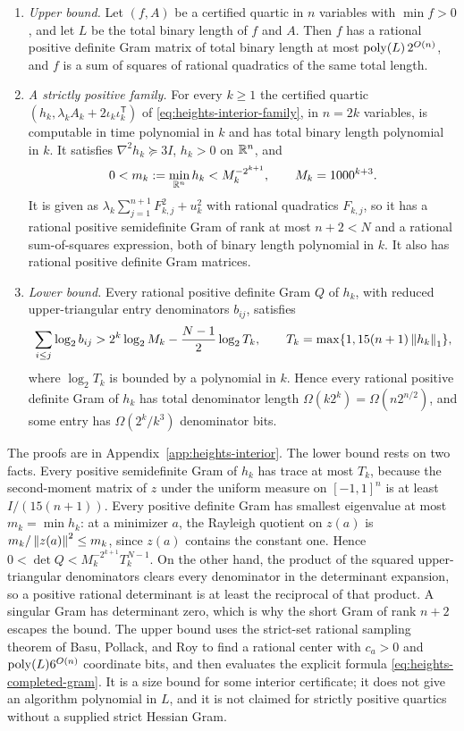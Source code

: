 \begin{theorem}
\label{thm:interior-gram}
\leavevmode
\begin{enumerate}[label=(\alph*)]
\item \emph{Upper bound.} Let $(f,A)$ be a certified quartic in $n$
  variables with $\min f>0$, and let $L$ be the total binary length of $f$
  and $A$. Then $f$ has a rational positive definite Gram matrix of total
  binary length at most $\operatorname{poly}(L)\,2^{O(n)}$, and $f$ is a sum of squares of
  rational quadratics of the same total length.
\item \emph{A strictly positive family.} For every $k\ge1$ the certified
  quartic $(h_k,\lambda_kA_k+2\iota_k\iota_k^{\mathsf T})$ of
  \eqref{eq:heights-interior-family}, in $n=2k$ variables, is computable in
  time polynomial in $k$ and has total binary length polynomial in $k$. It
  satisfies $\nabla^2h_k\succeq3I$, $h_k>0$ on $\mathbb R^n$, and
  \[
   0<m_k:=\min_{\mathbb R^n}h_k<M_k^{-2^{k+1}},\qquad M_k=1000^{k+3}.
  \]
  It is given as $\lambda_k\sum_{j=1}^{n+1}F_{k,j}^2+u_k^2$ with rational
  quadratics $F_{k,j}$, so it has a rational positive semidefinite Gram of
  rank at most $n+2<N$ and a rational sum-of-squares expression, both of
  binary length polynomial in $k$. It also has rational positive definite
  Gram matrices.
\item \emph{Lower bound.} Every rational positive definite Gram $Q$ of $h_k$,
  with reduced upper-triangular entry denominators $b_{ij}$, satisfies
  \[
   \sum_{i\le j}\log_2b_{ij}>2^k\log_2M_k-\frac{N-1}2\log_2T_k,
   \qquad T_k=\max\{1,15(n+1)\left\lVert h_k\right\rVert_1\},
  \]
  where $\log_2T_k$ is bounded by a polynomial in $k$. Hence every rational
  positive definite Gram of $h_k$ has total denominator length
  $\Omega(k2^k)=\Omega(n2^{n/2})$, and some entry has
  $\Omega(2^k/k^3)$ denominator bits.
\end{enumerate}
\end{theorem}

The proofs are in Appendix~\ref{app:heights-interior}. The lower bound rests
on two facts. Every positive semidefinite Gram of $h_k$ has trace at most
$T_k$, because the second-moment matrix of $z$ under the uniform measure on
$[-1,1]^n$ is at least $I/(15(n+1))$. Every positive definite Gram has
smallest eigenvalue at most $m_k=\min h_k$: at a minimizer $a$, the Rayleigh
quotient on $z(a)$ is $m_k/\left\lVert z(a)\right\rVert^2\le m_k$, since $z(a)$ contains the
constant one. Hence $0<\det Q<M_k^{-2^{k+1}}T_k^{N-1}$. On the other hand, the
product of the squared upper-triangular denominators clears every
denominator in the determinant expansion, so a positive rational determinant
is at least the reciprocal of that product. A singular Gram has determinant
zero, which is why the short Gram of rank $n+2$ escapes the bound. The upper
bound uses the strict-set rational sampling theorem of Basu, Pollack, and
Roy \cite[Theorem~4.1.2]{BasuPollackRoy1996} to find a rational center with
$c_a>0$ and $\operatorname{poly}(L)6^{O(n)}$ coordinate bits, and then evaluates the
explicit formula \eqref{eq:heights-completed-gram}. It is a size bound for
some interior certificate; it does not give an algorithm polynomial in $L$,
and it is not claimed for strictly positive quartics without a supplied
strict Hessian Gram.

